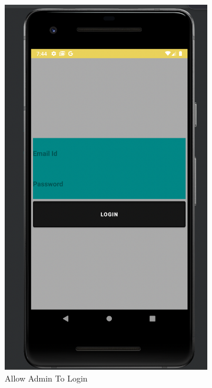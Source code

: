 \begin{figure}[H]
\begin{subfigure}[b]{0.3\textwidth}
         \includegraphics[width=\textwidth]{m4}
         \caption{Allow Admin To Login}
         \label{third disp}
     \end{subfigure}
     \hfill
     \begin{subfigure}[b]{0.3\textwidth}
         \centering

\end{subfigure}
\end{figure}
